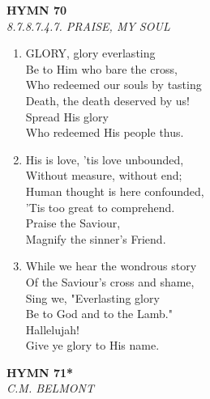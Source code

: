 \newpage
\begin{center}
    {\Large \textbf{HYMN 70}}
    \\
    \textit{8.7.8.7.4.7. PRAISE, MY SOUL}
\end{center}
\vspace{1em}

\begin{enumerate}
    \item GLORY, glory everlasting \\
        Be to Him who bare the cross, \\
        Who redeemed our souls by tasting \\
        Death, the death deserved by us! \\
        Spread His glory \\
        Who redeemed His people thus.

    \item His is love, 'tis love unbounded, \\
        Without measure, without end; \\
        Human thought is here confounded, \\
        'Tis too great to comprehend. \\
        Praise the Saviour, \\
        Magnify the sinner's Friend.

    \item While we hear the wondrous story \\
        Of the Saviour's cross and shame, \\
        Sing we, "Everlasting glory \\
        Be to God and to the Lamb." \\
        Hallelujah! \\
        Give ye glory to His name.

\end{enumerate}

\newpage
\begin{center}
    {\Large \textbf{HYMN 71*}}
    \\
    \textit{C.M. BELMONT}
\end{center}
\vspace{1em}

